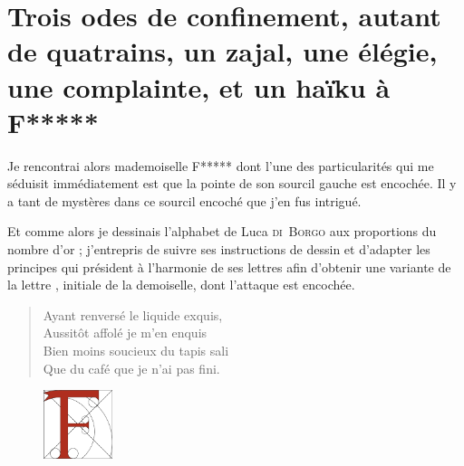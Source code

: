 \afterpage{}
\section*{Trois odes de confinement, autant de quatrains, un zajal, une élégie, une complainte, et un haïku à F*****}

\begin{prose}
  Je rencontrai alors mademoiselle F***** dont l’une des particularités qui me séduisit immédiatement est que la pointe de son sourcil gauche est encochée. Il y a tant de mystères dans ce sourcil encoché que j’en fus intrigué.

  Et comme alors je dessinais l’alphabet de Luca \textsc{di~Borgo} aux proportions du nombre d’or ; j’entrepris de suivre ses instructions de dessin et d’adapter les principes qui président à l’harmonie de ses lettres afin d’obtenir une variante de la lettre , initiale de la demoiselle, dont l’attaque est encochée. 

\end{prose}




\begin{verse}%
  \quatrain%
%
  Ayant renversé le liquide exquis,\\  %
  Aussitôt affolé je m’en enquis\\  %
  Bien moins soucieux du tapis sali\\  %
  Que du café que je n’ai pas fini.
\end{verse}

\begin{figure}[h]
  \centering
  \includegraphics[height=2cm]{F.pdf}
  \captionsetup{labelformat=empty}
  \caption[Lettre  à l’attaque encochée]{}
\end{figure}



